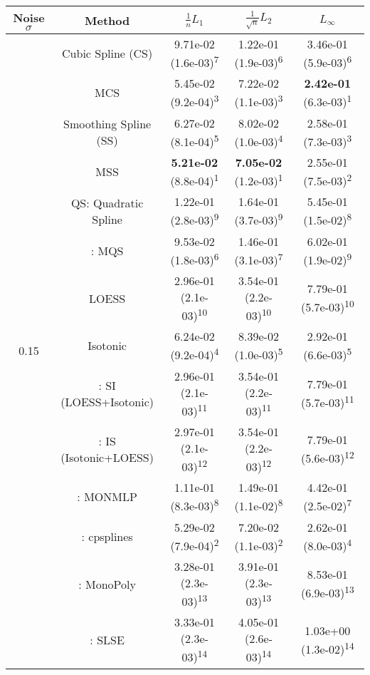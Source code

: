 \begin{tabular}{ccccc}
\toprule
Noise $\sigma$ & Method&$\frac 1n L_1$&$\frac{1}{\sqrt n}L_2$&$L_\infty$\tabularnewline
\midrule
\multirow{14}{*}{0.15}&Cubic Spline (CS)& 9.71e-02 (1.6e-03)\textsuperscript{7}& 1.22e-01 (1.9e-03)\textsuperscript{6}& 3.46e-01 (5.9e-03)\textsuperscript{6}\tabularnewline
&MCS& 5.45e-02 (9.2e-04)\textsuperscript{3}& 7.22e-02 (1.1e-03)\textsuperscript{3}& \textbf{2.42e-01} (6.3e-03)\textsuperscript{1}\tabularnewline
&Smoothing Spline (SS)& 6.27e-02 (8.1e-04)\textsuperscript{5}& 8.02e-02 (1.0e-03)\textsuperscript{4}& 2.58e-01 (7.3e-03)\textsuperscript{3}\tabularnewline
&MSS& \textbf{5.21e-02} (8.8e-04)\textsuperscript{1}& \textbf{7.05e-02} (1.2e-03)\textsuperscript{1}& 2.55e-01 (7.5e-03)\textsuperscript{2}\tabularnewline
&QS: Quadratic Spline& 1.22e-01 (2.8e-03)\textsuperscript{9}& 1.64e-01 (3.7e-03)\textsuperscript{9}& 5.45e-01 (1.5e-02)\textsuperscript{8}\tabularnewline
&\textcite{heMonotoneBsplineSmoothing1998}: MQS& 9.53e-02 (1.8e-03)\textsuperscript{6}& 1.46e-01 (3.1e-03)\textsuperscript{7}& 6.02e-01 (1.9e-02)\textsuperscript{9}\tabularnewline
&LOESS& 2.96e-01 (2.1e-03)\textsuperscript{10}& 3.54e-01 (2.2e-03)\textsuperscript{10}& 7.79e-01 (5.7e-03)\textsuperscript{10}\tabularnewline
&Isotonic& 6.24e-02 (9.2e-04)\textsuperscript{4}& 8.39e-02 (1.0e-03)\textsuperscript{5}& 2.92e-01 (6.6e-03)\textsuperscript{5}\tabularnewline
&\textcite{mammenEstimatingSmoothMonotone1991}: SI (LOESS+Isotonic)& 2.96e-01 (2.1e-03)\textsuperscript{11}& 3.54e-01 (2.2e-03)\textsuperscript{11}& 7.79e-01 (5.7e-03)\textsuperscript{11}\tabularnewline
&\textcite{mammenEstimatingSmoothMonotone1991}: IS (Isotonic+LOESS)& 2.97e-01 (2.1e-03)\textsuperscript{12}& 3.54e-01 (2.2e-03)\textsuperscript{12}& 7.79e-01 (5.6e-03)\textsuperscript{12}\tabularnewline
&\textcite{cannonMonmlpMultilayerPerceptron2017}: MONMLP& 1.11e-01 (8.3e-03)\textsuperscript{8}& 1.49e-01 (1.1e-02)\textsuperscript{8}& 4.42e-01 (2.5e-02)\textsuperscript{7}\tabularnewline
&\textcite{navarro-garciaConstrainedSmoothingOutofrange2023}: cpsplines& 5.29e-02 (7.9e-04)\textsuperscript{2}& 7.20e-02 (1.1e-03)\textsuperscript{2}& 2.62e-01 (8.0e-03)\textsuperscript{4}\tabularnewline
&\textcite{murrayFastFlexibleMethods2016a}: MonoPoly& 3.28e-01 (2.3e-03)\textsuperscript{13}& 3.91e-01 (2.3e-03)\textsuperscript{13}& 8.53e-01 (6.9e-03)\textsuperscript{13}\tabularnewline
&\textcite{groeneboomConfidenceIntervalsMonotone2023}: SLSE& 3.33e-01 (2.3e-03)\textsuperscript{14}& 4.05e-01 (2.6e-03)\textsuperscript{14}& 1.03e+00 (1.3e-02)\textsuperscript{14}\tabularnewline
\midrule

\end{tabular}
